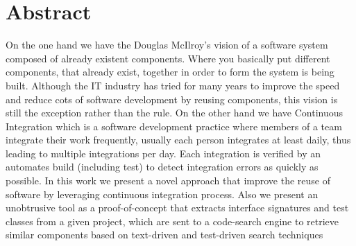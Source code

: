 \chapter{Abstract}
On the one hand we have the Douglas McIlroy's vision \cite{McIlroy1968} of a software system composed of already existent components. Where you basically put different components, that already exist, together in order to form the system is being built. Although the IT industry has tried for many years to improve the speed and reduce cots of software development by reusing components, this vision is still the exception rather than the rule. On the other hand we have Continuous Integration which is a software development practice where members of a team integrate their work frequently, usually each person integrates at least daily, thus leading to multiple integrations per day. Each integration is verified by an automates build (including test) to detect integration errors as quickly as possible. In this work we present a novel approach that improve the reuse of software by leveraging continuous integration process. Also we present an unobtrusive tool as a proof-of-concept that extracts interface signatures and test classes from a given project, which are sent to a code-search engine to retrieve similar components based on text-driven and test-driven search techniques